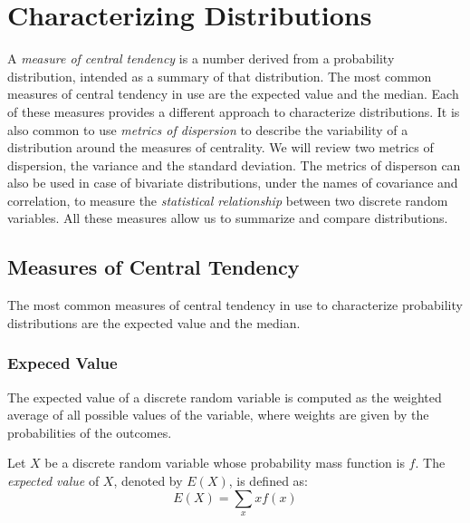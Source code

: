 %
%

\section{Characterizing Distributions}
\label{sec:probability_expectation}

A \emph{measure of central tendency} is a number derived from a probability distribution, intended as a summary of that distribution. The most common measures of central tendency in use are the expected value and the median. Each of these measures provides a different approach to characterize distributions. It is also common to use \emph{metrics of dispersion} to describe the variability of a distribution around the measures of centrality. We will review two metrics of dispersion, the variance and the standard deviation. The metrics of disperson can also be used in case of bivariate distributions, under the names of covariance and correlation, to measure the \emph{statistical relationship} between two discrete random variables. All these measures allow us to summarize and compare distributions.

%
%

\subsection{Measures of Central Tendency}

The most common measures of central tendency in use to characterize probability distributions are the expected value and the median.


\subsubsection*{Expeced Value}

The expected value of a discrete random variable is computed as the weighted average of all possible values of the variable, where weights are given by the probabilities of the outcomes.

\begin{definition}\label{probability:expectation}
Let $X$ be a discrete random variable whose probability mass function is $f$. The \emph{expected value} of $X$, denoted by $E\left(X\right)$, is defined as:
\[
E\left(X\right)=\sum_{x}xf\left(x\right)
\]
\end{definition}

